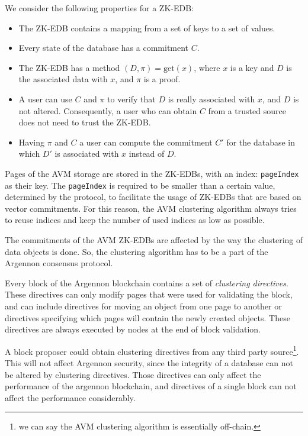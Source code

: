 We consider the following properties for a ZK-EDB:
\begin{itemize}
    \item The ZK-EDB contains a mapping from a set of keys to a set of values.
    \item Every state of the database has a commitment \(C\).
    \item The ZK-EDB has a method \((D, \pi) = \text{get}(x)\), where \(x\) is a key and \(D\) is the associated data
    with \(x\), and \(\pi\) is a proof.
    \item A user can use \(C\) and \(\pi\) to verify that \(D\) is really associated with \(x\), and \(D\) is not
    altered. Consequently, a user who can obtain \(C\) from a trusted source does not need to trust the ZK-EDB\@.
    \item Having \(\pi\) and \(C\) a user can compute the commitment \(C'\) for the database in which \(D'\) is
    associated with \(x\) instead of \(D\).
\end{itemize}

Pages of the AVM storage are stored in the ZK-EDBs, with an index: \texttt{pageIndex} as their key.
The \texttt{pageIndex} is required to be smaller than a certain value, determined by the
protocol, to facilitate the usage of ZK-EDBs that are based on vector commitments.
For this reason, the AVM clustering algorithm always tries to reuse indices and keep the number of used indices
as low as possible.

The commitments of the AVM ZK-EDBs are affected by the way the clustering of data objects is done. So,
the clustering algorithm has to be a part of the Argennon consensus protocol.

Every block of the Argennon blockchain contains a set of \emph{clustering directives}. These directives
can only modify pages that were used for validating the block, and can
include directives for moving an object from one page to another or directives specifying which pages will contain
the newly created objects. These directives are always executed by nodes at the end of block validation.

A block proposer could obtain clustering directives from any third party source\footnote{we can say the AVM clustering
algorithm is essentially off-chain.}. This will not
affect Argennon security, since the integrity of a database can not be altered by clustering directives.
Those directives can only affect the performance of the argennon blockchain, and directives of a single block can
not affect the performance considerably.

